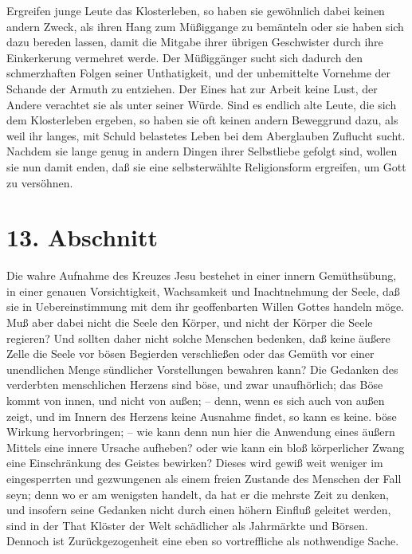 \medskip

Ergreifen junge Leute das Klosterleben, so haben sie gewöhnlich dabei keinen
andern Zweck, als ihren Hang zum Müßiggange zu bemänteln oder sie haben sich
dazu bereden lassen, damit die Mitgabe ihrer übrigen Geschwister durch ihre
Einkerkerung vermehret werde. Der Müßiggänger sucht sich dadurch den
schmerzhaften Folgen seiner Unthatigkeit, und der unbemittelte Vornehme der
Schande der Armuth zu entziehen. Der Eines hat zur Arbeit keine Lust, der Andere
verachtet sie als unter seiner Würde. Sind es endlich alte Leute, die sich dem
Klosterleben ergeben, so haben sie oft keinen andern Beweggrund dazu, als weil
ihr langes, mit Schuld belastetes Leben bei dem Aberglauben Zuflucht sucht.
Nachdem sie lange genug in andern Dingen ihrer Selbstliebe gefolgt sind, wollen
sie nun damit enden, daß sie eine selbsterwählte Religionsform ergreifen, um
Gott zu versöhnen.

\section{13. Abschnitt} \label{kap5_ab13}

Die wahre Aufnahme des Kreuzes Jesu bestehet in einer innern Gemüthsübung, in
einer genauen Vorsichtigkeit, Wachsamkeit und Inachtnehmung der Seele, daß sie
in Uebereinstimmung mit dem ihr geoffenbarten Willen Gottes handeln möge. Muß
aber dabei nicht die Seele den Körper, und nicht der Körper die Seele regieren?
Und sollten daher nicht solche Menschen bedenken, daß keine äußere Zelle die
Seele vor bösen Begierden verschließen oder das Gemüth vor einer unendlichen
Menge sündlicher Vorstellungen bewahren kann? Die Gedanken des verderbten
menschlichen Herzens sind böse, und zwar unaufhörlich; das Böse kommt von innen,
und nicht von außen; -- denn, wenn es sich auch von außen zeigt, und im Innern
des Herzens keine Ausnahme findet, so kann es keine. böse Wirkung hervorbringen;
-- wie kann denn nun hier die Anwendung eines äußern Mittels eine innere Ursache
aufheben? oder wie kann ein bloß körperlicher Zwang eine Einschränkung des
Geistes bewirken? Dieses wird gewiß weit weniger im eingesperrten und
gezwungenen als einem freien Zustande des Menschen der Fall seyn; denn wo er am
wenigsten handelt, da hat er die mehrste Zeit zu denken, und insofern seine
Gedanken nicht durch einen höhern Einfluß geleitet werden, sind in der That
Klöster der Welt schädlicher als Jahrmärkte und Börsen. Dennoch ist
Zurückgezogenheit eine eben so vortreffliche als nothwendige Sache.

